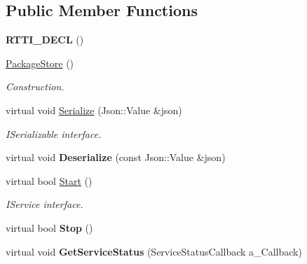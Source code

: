 \subsection*{Public Member Functions}
\begin{DoxyCompactItemize}
\item 
\mbox{\label{class_package_store_ad434d9b754137b340341e97476df6b38}} 
{\bfseries R\+T\+T\+I\+\_\+\+D\+E\+CL} ()
\item 
\mbox{\label{class_package_store_aacca93681e760a9663f96df10947ddd0}} 
\hyperlink{class_package_store_aacca93681e760a9663f96df10947ddd0}{Package\+Store} ()
\begin{DoxyCompactList}\small\item\em Construction. \end{DoxyCompactList}\item 
\mbox{\label{class_package_store_add35765608d83e9cdddea9603c661909}} 
virtual void \hyperlink{class_package_store_add35765608d83e9cdddea9603c661909}{Serialize} (Json\+::\+Value \&json)
\begin{DoxyCompactList}\small\item\em I\+Serializable interface. \end{DoxyCompactList}\item 
\mbox{\label{class_package_store_a14f18a98122858e0e6580f102669fbe9}} 
virtual void {\bfseries Deserialize} (const Json\+::\+Value \&json)
\item 
\mbox{\label{class_package_store_a429969a30bac520dcffa0649bea2cef1}} 
virtual bool \hyperlink{class_package_store_a429969a30bac520dcffa0649bea2cef1}{Start} ()
\begin{DoxyCompactList}\small\item\em I\+Service interface. \end{DoxyCompactList}\item 
\mbox{\label{class_package_store_abdcbb72ed4e12e01f3fdac5ed112f7c8}} 
virtual bool {\bfseries Stop} ()
\item 
\mbox{\label{class_package_store_a15c8adcfc5e64ff53fda42ce4110922b}} 
virtual void {\bfseries Get\+Service\+Status} (Service\+Status\+Callback a\+\_\+\+Callback)

\end{DoxyCompactItemize}
